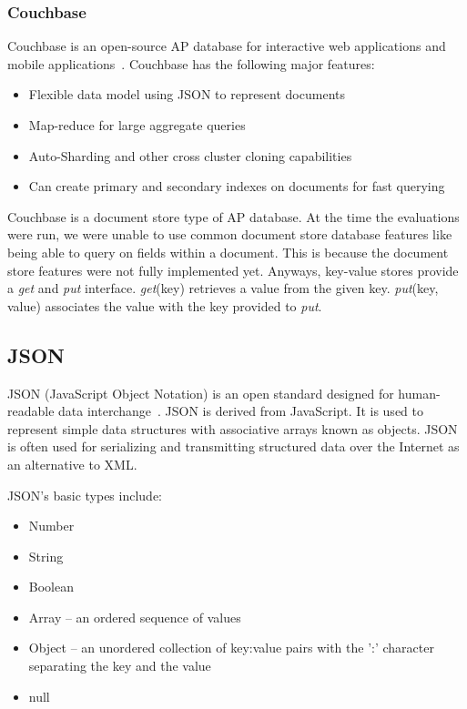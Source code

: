 \documentclass[12pt]{ucthesis}
\begin{document}
\subsubsection{Couchbase}
Couchbase is an open-source AP database for interactive web applications and mobile applications~\cite{couchbase}. Couchbase has the following major features:
\begin{itemize}
\item Flexible data model using JSON to represent documents
\item Map-reduce for large aggregate queries
\item Auto-Sharding and other cross cluster cloning capabilities
\item Can create primary and secondary indexes on documents for fast querying
\end{itemize}

Couchbase is a document store type of AP database. At the time the evaluations were run, we were unable to
use common document store database features like being able to query on fields within a document. This is because the document store features were not fully implemented yet. Anyways, key-value
stores provide a \textit{get} and \textit{put} interface. \textit{get}(key) retrieves a value from the given key. \textit{put}(key, value) associates the value with the key provided to \textit{put}.


\subsection{JSON}

JSON (JavaScript Object Notation) is an open standard designed for human-readable data interchange~\cite{json}. JSON is derived from JavaScript. It is used to represent simple data structures with associative arrays known as objects. JSON is often used for serializing and transmitting structured data over the Internet as an alternative to XML.

JSON's basic types include:
\begin{itemize}
\item Number
\item String
\item Boolean
\item Array -- an ordered sequence of values
\item Object -- an unordered collection of key:value pairs with the ':' character separating the key and the value
\item null
\end{itemize}
\end{document}
